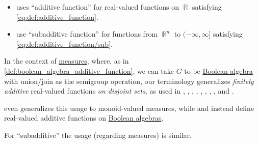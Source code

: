 \begin{remark}
\begin{itemize}
    \item \Textcite[exerc. 5.2.15]{Carothers2000RealAnalysis} uses \enquote{additive function} for real-valued functions on \( \BbbR \) satisfying \eqref{eq:def:additive_function}.

    \item \Textcite[rem. 2.10]{HugWeil2020ConvexGeometry} use \enquote{subadditive function} for functions from \( \BbbR^n \) to \( (-\infty, \infty] \) satisfying \eqref{eq:def:additive_function/sub}.
  \end{itemize}

  In the context of \hyperref[def:measure]{measures}, where, as in \cref{def:boolean_algebra_additive_function}, we can take \( G \) to be \hyperref[def:boolean_algebra]{Boolean algebra} with union/join as the semigroup operation, our terminology generalizes \emph{finitely additive} real-valued functions \emph{on disjoint sets}, as used in
  \cite[13]{Malliavin1995IntegrationAndProbability},
  \cite[25]{Folland1999RealAnalysis},
  \cite[7]{Cohn2013MeasureTheory},
  \cite[30]{Halmos1976MeasureTheory},
  \cite[6]{Tao2011MeasureTheory},
  \cite[51]{КанторовичАкилов1984ФункциональныйАнализ},
  \cite[15]{Боровков1999ТеорияВероятностей},
  \cite[def. 1.3.1]{Богачёв2003ОсновыТеорииМерыТом1},
  \cite[def. II.1.2]{Ширяев2007ВероятностьТом1} and
  \cite[21]{ДимитровЯнев2007ВероятностиИСтатистика}.

  \textcite[\S 11.37]{Schechter1997AnalysisHandbook} even generalizes this usage to monoid-valued measures, while \textcite[55]{Владимиров1969БулевыАлгебры} and \textcite[56]{КусраевКутателадзе2005БулевозначныйАнализ} instead define real-valued additive functions on \hyperref[def:boolean_algebra]{Boolean algebras}.

  For \enquote{subadditive} the usage (regarding measures) is similar.
\end{remark}

